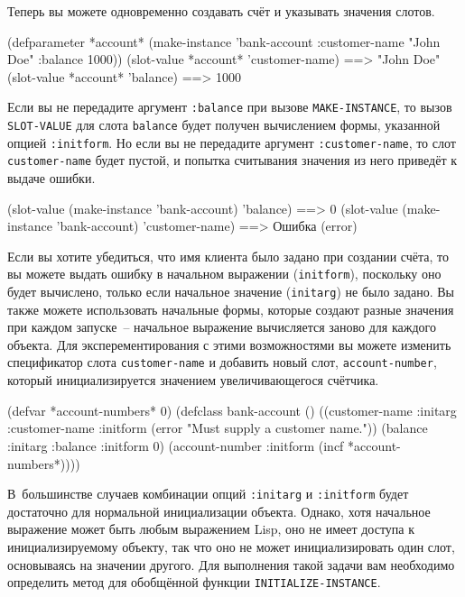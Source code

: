 Теперь вы можете одновременно создавать счёт и указывать значения слотов.

\begin{myverb}
(defparameter *account*
  (make-instance 'bank-account :customer-name "John Doe" :balance 1000))
(slot-value *account* 'customer-name) ==> "John Doe"
(slot-value *account* 'balance)       ==> 1000
\end{myverb}

Если вы не передадите аргумент \lstinline{:balance} при вызове \lstinline{MAKE-INSTANCE}, то вызов
\lstinline{SLOT-VALUE} для слота \lstinline{balance} будет получен вычислением формы, указанной
опцией \lstinline{:initform}.  Но если вы не передадите аргумент \lstinline{:customer-name}, то
слот \lstinline{customer-name} будет пустой, и попытка считывания значения из него приведёт к
выдаче ошибки.

\begin{myverb}
(slot-value (make-instance 'bank-account) 'balance)       ==> 0
(slot-value (make-instance 'bank-account) 'customer-name) ==> Ошибка (error)
\end{myverb}

Если вы хотите убедиться, что имя клиента было задано при создании счёта, то вы можете
выдать ошибку в начальном выражении (\lstinline{initform}), поскольку оно будет вычислено,
только если начальное значение (\lstinline{initarg}) не было задано.  Вы также можете
использовать начальные формы, которые создают разные значения при каждом запуске~--
начальное выражение вычисляется заново для каждого объекта.  Для эксперементирования с
этими возможностями вы можете изменить спецификатор слота \lstinline{customer-name} и добавить
новый слот, \lstinline{account-number}, который инициализируется значением увеличивающегося
счётчика.

\begin{myverb}
(defvar *account-numbers* 0)
(defclass bank-account ()
  ((customer-name
    :initarg :customer-name
    :initform (error "Must supply a customer name."))
   (balance
    :initarg :balance
    :initform 0)
   (account-number
    :initform (incf *account-numbers*))))
\end{myverb}

В~большинстве случаев комбинации опций \lstinline{:initarg} и \lstinline{:initform} будет
достаточно для нормальной инициализации объекта.  Однако, хотя начальное выражение может
быть любым выражением Lisp, оно не имеет доступа к инициализируемому объекту, так что оно
не может инициализировать один слот, основываясь на значении другого.  Для выполнения
такой задачи вам необходимо определить метод для обобщённой функции
\lstinline{INITIALIZE-INSTANCE}.

